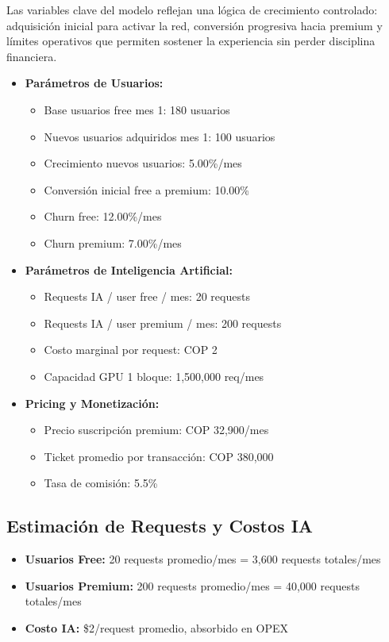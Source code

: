 \documentclass[12pt]{article}
\begin{document}
Las variables clave del modelo reflejan una lógica de crecimiento controlado: adquisición inicial para activar la red, conversión progresiva hacia premium y límites operativos que permiten sostener la experiencia sin perder disciplina financiera.

\begin{itemize}
    \item \textbf{Parámetros de Usuarios:}
    \begin{itemize}
        \item Base usuarios free mes 1: 180 usuarios
        \item Nuevos usuarios adquiridos mes 1: 100 usuarios
        \item Crecimiento nuevos usuarios: 5.00\%/mes
        \item Conversión inicial free a premium: 10.00\%
        \item Churn free: 12.00\%/mes
        \item Churn premium: 7.00\%/mes
    \end{itemize}
    \item \textbf{Parámetros de Inteligencia Artificial:}
    \begin{itemize}
        \item Requests IA / user free / mes: 20 requests
        \item Requests IA / user premium / mes: 200 requests
        \item Costo marginal por request: COP 2
        \item Capacidad GPU 1 bloque: 1,500,000 req/mes
    \end{itemize}
    \item \textbf{Pricing y Monetización:}
    \begin{itemize}
        \item Precio suscripción premium: COP 32,900/mes
        \item Ticket promedio por transacción: COP 380,000
        \item Tasa de comisión: 5.5\%
    \end{itemize}
\end{itemize}

\subsection{Estimación de Requests y Costos IA}

\begin{itemize}
    \item \textbf{Usuarios Free:} 20 requests promedio/mes = 3,600 requests totales/mes
    \item \textbf{Usuarios Premium:} 200 requests promedio/mes = 40,000 requests totales/mes
    \item \textbf{Costo IA:} \$2/request promedio, absorbido en OPEX
\end{itemize}
\end{document}
